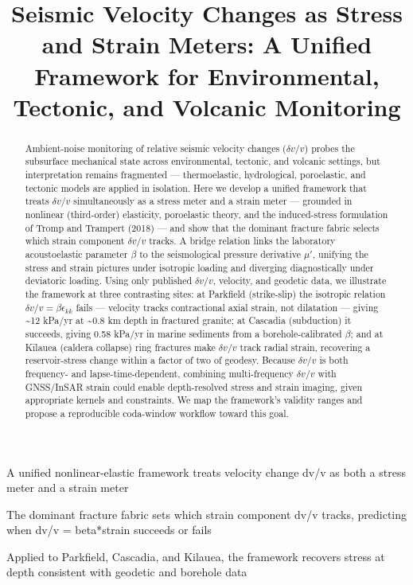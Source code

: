 \documentclass[draft]{agujournal2019}
\begin{document}
\title{Seismic Velocity Changes as Stress and Strain Meters: A Unified
Framework for Environmental, Tectonic, and Volcanic Monitoring}




\begin{keypoints}
\item A unified nonlinear-elastic framework treats velocity change dv/v
as both a stress meter and a strain meter
\item The dominant fracture fabric sets which strain component dv/v
tracks, predicting when dv/v = beta*strain succeeds or fails
\item Applied to Parkfield, Cascadia, and Kilauea, the framework
recovers stress at depth consistent with geodetic and borehole data
\end{keypoints}

\begin{abstract}
Ambient-noise monitoring of relative seismic velocity changes
(\(\delta v/v\)) probes the subsurface mechanical state across
environmental, tectonic, and volcanic settings, but interpretation
remains fragmented --- thermoelastic, hydrological, poroelastic, and
tectonic models are applied in isolation. Here we develop a unified
framework that treats \(\delta v/v\) simultaneously as a stress meter
and a strain meter --- grounded in nonlinear (third-order) elasticity,
poroelastic theory, and the induced-stress formulation of Tromp and
Trampert (2018) --- and show that the dominant fracture fabric selects
which strain component \(\delta v/v\) tracks. A bridge relation links
the laboratory acoustoelastic parameter \(\beta\) to the seismological
pressure derivative \(\mu'\), unifying the stress and strain pictures
under isotropic loading and diverging diagnostically under deviatoric
loading. Using only published \(\delta v/v\), velocity, and geodetic
data, we illustrate the framework at three contrasting sites: at
Parkfield (strike-slip) the isotropic relation
\(\delta v/v = \beta\epsilon_{kk}\) fails --- velocity tracks
contractional axial strain, not dilatation --- giving \textasciitilde12
kPa/yr at \textasciitilde0.8 km depth in fractured granite; at Cascadia
(subduction) it succeeds, giving 0.58 kPa/yr in marine sediments from a
borehole-calibrated \(\beta\); and at Kīlauea (caldera collapse) ring
fractures make \(\delta v/v\) track radial strain, recovering a
reservoir-stress change within a factor of two of geodesy. Because
\(\delta v/v\) is both frequency- and lapse-time-dependent, combining
multi-frequency \(\delta v/v\) with GNSS/InSAR strain could enable
depth-resolved stress and strain imaging, given appropriate kernels and
constraints. We map the framework's validity ranges and propose a
reproducible coda-window workflow toward this goal.
\end{abstract}
\end{document}
